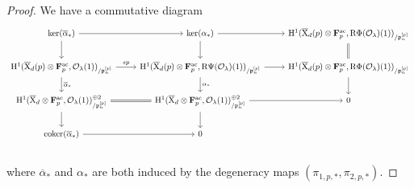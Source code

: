 \documentclass[10pt]{amsart}
\numberwithin{equation}{section}
\theoremstyle{plain}
\numberwithin{equation}{section}
\theoremstyle{definition}
\theoremstyle{remark}
\def\coker{\mathrm{coker}}
\def\ac{\mathrm{ac}}
\def\ac{\mathrm{ac}}
\def\calO{\mathcal{O}}
\def\frakp{\mathfrak{p}}
\def\FF{\mathbf{F}}
\def\rmH{\mathrm{H}}
\def\rmX{\mathrm{X}}
\def\rmR{\mathrm{R}}
\begin{document}
\begin{proof}
We have a commutative diagram
\begin{equation}\label{dia1}
\begin{tikzcd}
\ker(\overline{\alpha}_{\ast}) \arrow[d] \arrow[r]            &\ker({\alpha}_{\ast})   \arrow[d] \arrow[r]          &   \rmH^{1}(\overline{\rmX}_{d}(p)\otimes{\FF^{\ac}_{p}}, \rmR\Phi(\calO_{\lambda})(1))_{/\frakp^{[p]}_{n}}    \arrow[d, Rightarrow, no head]       \\
\rmH^{1}(\overline{\rmX}_{d}(p)\otimes{\FF^{\ac}_{p}}, \calO_{\lambda}(1))_{/\frakp^{[p]}_{n}} \arrow[r, "sp"] \arrow[d, "\overline{\alpha}_{\ast}"]      & \rmH^{1}(\overline{\rmX}_{d}(p)\otimes{\FF^{\ac}_{p}}, \rmR\Psi(\calO_{\lambda})(1))_{/\frakp^{[p]}_{n}} \arrow[r] \arrow[d, "\alpha_{\ast}"] & \rmH^{1}(\overline{\rmX}_{d}(p)\otimes{\FF^{\ac}_{p}}, \rmR\Phi(\calO_{\lambda})(1))_{/\frakp^{[p]}_{n}} \arrow[d] \\
\rmH^{1}(\overline{\rmX}_{d}\otimes{\FF^{\ac}_{p}}, \calO_{\lambda}(1))^{\oplus 2}_{/\frakp^{[p]}_{n}}\arrow[r, Rightarrow, no head]\arrow[d] & \rmH^{1}(\overline{\rmX}_{d}\otimes {\FF^{\ac}_{p}}, \calO_{\lambda}(1))^{\oplus 2}_{/\frakp^{[p]}_{n}}\arrow[r] \arrow[d]     & 0      \\
\coker(\overline{\alpha}_{\ast})\arrow[r] &0\\    
\end{tikzcd}
\end{equation}
where $\overline{\alpha}_{\ast}$ and $\alpha_{\ast}$ are both induced by the degeneracy maps $(\pi_{1,p,\ast}, \pi_{2,p,\ast})$. 


\end{proof}
\end{document}

